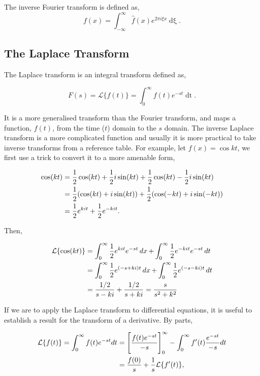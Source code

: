 \documentclass[11pt]{amsart}
\begin{document}
The inverse Fourier transform is defined as,
$$f(x) = \int_{-\infty}^{\infty}\hat{f}(x)e^{2\pi i\xi x}\mathop{d\xi}.$$

\subsection{The Laplace Transform}

The Laplace transform is an integral transform defined as,

$$F(s) = \mathcal{L}\{f(t)\} = \int_{0}^{\infty} f(t)e^{-st}\mathop{dt}.$$

It is a more generalised transform than the Fourier transform, and maps a function, $f(t)$, from the time ($t$) domain to the $s$ domain. The inverse Laplace transform is a more complicated function and usually it is more practical to take inverse transforms from a reference table. For example, let $f(x) = \cos kt$, we first use a trick to convert it to a more amenable form,

\begin{align}
\cos(kt) &= \frac{1}{2}\cos(kt) + \frac{1}{2}i\sin(kt) + \frac{1}{2}\cos(kt) - \frac{1}{2}i\sin(kt) \notag \\
&= \frac{1}{2}(\cos(kt) + i\sin(kt)) + \frac{1}{2}(\cos(-kt) + i\sin(-kt)) \notag \\
&= \frac{1}{2}e^{kit} + \frac{1}{2}e^{-kit}. \notag
\end{align}

Then,

\begin{align}
\mathcal{L}\{\cos(kt)\} &= \int_{0}^{\infty} \frac{1}{2}e^{kit}e^{-st} \mathop{dx} + \int_{0}^{\infty} \frac{1}{2}e^{-kit}e^{-st} \mathop{dt} \notag \\
&= \int_{0}^{\infty} \frac{1}{2}e^{(-s + ki)t} \mathop{dx} + \int_{0}^{\infty} \frac{1}{2}e^{(-s - ki)t}\mathop{dt} \notag \\
&= \frac{1/2}{s - ki} + \frac{1/2}{s + ki} = \frac{s}{s^2 + k^2} \notag
\end{align}

If we are to apply the Laplace transform to differential equations, it is useful to establish a result for the transform of a derivative. By parts,

\begin{align}
\mathcal{L}\{f(t)\} = \int_{0}^{\infty} f(t)e^{-st}dt &= \Bigg[\frac{f(t)e^{-st}}{-s}\Bigg]_0^{\infty} - \int_{0}^{\infty} f'(t)\frac{e^{-st}}{-s}dt \notag \\
&= \frac{f(0)}{s} + \frac{1}{s}\mathcal{L}\{f'(t)\} \notag,
\end{align}
\end{document}
